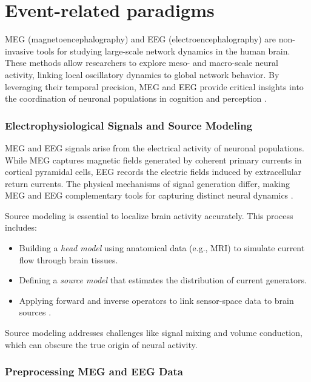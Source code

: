 
\section{Event-related paradigms}


MEG (magnetoencephalography) and EEG (electroencephalography) are non-invasive tools for studying large-scale network dynamics in the human brain. These methods allow researchers to explore meso- and macro-scale neural activity, linking local oscillatory dynamics to global network behavior. By leveraging their temporal precision, MEG and EEG provide critical insights into the coordination of neuronal populations in cognition and perception \cite{gross2019meg}.

\subsubsection*{Electrophysiological Signals and Source Modeling}

MEG and EEG signals arise from the electrical activity of neuronal populations. While MEG captures magnetic fields generated by coherent primary currents in cortical pyramidal cells, EEG records the electric fields induced by extracellular return currents. The physical mechanisms of signal generation differ, making MEG and EEG complementary tools for capturing distinct neural dynamics \cite{palva2012functional}.

Source modeling is essential to localize brain activity accurately. This process includes:
\begin{itemize}
    \item Building a \textit{head model} using anatomical data (e.g., MRI) to simulate current flow through brain tissues.
    \item Defining a \textit{source model} that estimates the distribution of current generators.
    \item Applying forward and inverse operators to link sensor-space data to brain sources \cite{gross2019meg}.
\end{itemize}

Source modeling addresses challenges like signal mixing and volume conduction, which can obscure the true origin of neural activity.

\subsubsection*{Preprocessing MEG and EEG Data}

